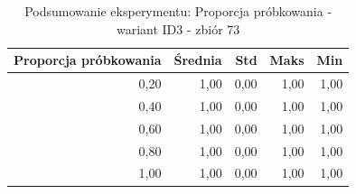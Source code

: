 \begin{table}[htbp]
\centering
\small
\setlength{\tabcolsep}{6pt}
\renewcommand{\arraystretch}{1.2}
\caption{Podsumowanie eksperymentu: Proporcja próbkowania - wariant ID3 - zbiór 73}
\label{tab:ID3_sample_ratio_73}
\begin{tabular}{r|r|r|r|r}
\toprule
Proporcja próbkowania & Średnia & Std & Maks & Min \\
\hline
0,20 & 1,00 & 0,00 & 1,00 & 1,00 \\
0,40 & 1,00 & 0,00 & 1,00 & 1,00 \\
0,60 & 1,00 & 0,00 & 1,00 & 1,00 \\
0,80 & 1,00 & 0,00 & 1,00 & 1,00 \\
1,00 & 1,00 & 0,00 & 1,00 & 1,00 \\
\bottomrule
\end{tabular}
\end{table}